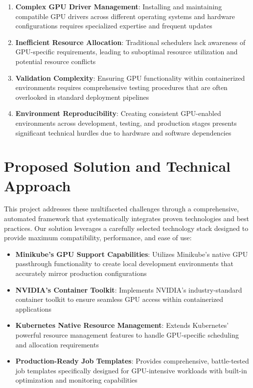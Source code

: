 \documentclass[12pt,a4paper]{report}
\begin{document}
\vspace{0.3cm}

\begin{enumerate}
    \item \textbf{Complex GPU Driver Management}: Installing and maintaining compatible GPU drivers across different operating systems and hardware configurations requires specialized expertise and frequent updates
    \item \textbf{Inefficient Resource Allocation}: Traditional schedulers lack awareness of GPU-specific requirements, leading to suboptimal resource utilization and potential resource conflicts
    \item \textbf{Validation Complexity}: Ensuring GPU functionality within containerized environments requires comprehensive testing procedures that are often overlooked in standard deployment pipelines
    \item \textbf{Environment Reproducibility}: Creating consistent GPU-enabled environments across development, testing, and production stages presents significant technical hurdles due to hardware and software dependencies
\end{enumerate}

\section{Proposed Solution and Technical Approach}
This project addresses these multifaceted challenges through a comprehensive, automated framework that systematically integrates proven technologies and best practices. Our solution leverages a carefully selected technology stack designed to provide maximum compatibility, performance, and ease of use:

\begin{itemize}
    \item \textbf{Minikube's GPU Support Capabilities}: Utilizes Minikube's native GPU passthrough functionality to create local development environments that accurately mirror production configurations
    \item \textbf{NVIDIA's Container Toolkit}: Implements NVIDIA's industry-standard container toolkit to ensure seamless GPU access within containerized applications
    \item \textbf{Kubernetes Native Resource Management}: Extends Kubernetes' powerful resource management features to handle GPU-specific scheduling and allocation requirements
    \item \textbf{Production-Ready Job Templates}: Provides comprehensive, battle-tested job templates specifically designed for GPU-intensive workloads with built-in optimization and monitoring capabilities
\end{itemize}
\end{document}
